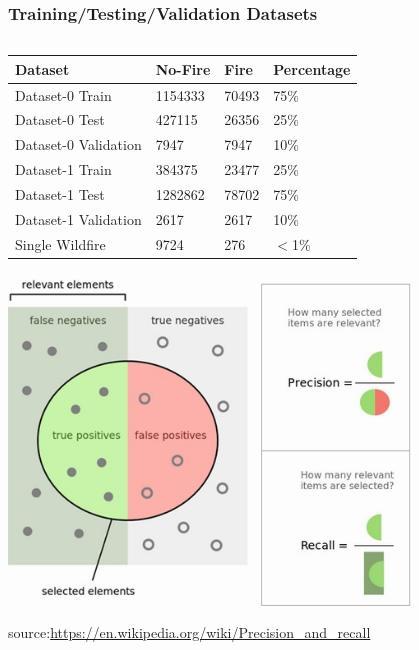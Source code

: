 \documentclass{beamer}
\begin{document}
\begin{frame}
  \frametitle{Training/Testing/Validation Datasets}


\begin{columns}[T]
    \begin{column}{.6\textwidth}
 \vspace{-0.25cm}   
\small
    \begin{tabular}{ | l | l | l | l |}
    \hline

    Dataset & No-Fire & Fire & Percentage\\ \hline
    Dataset-0 Train & 1154333 & 70493 & 75\% \\ 
    Dataset-0 Test  & 427115 & 26356 & 25\% \\ 

    Dataset-0 Validation & 7947 & 7947 & 10\% \\ \hline
    Dataset-1 Train & 384375 & 23477 & 25\% \\ 

    Dataset-1 Test  & 1282862 & 78702 & 75\% \\ 

    Dataset-1 Validation & 2617 & 2617 & 10\% \\ \hline
    Single Wildfire & 9724 & 276 & $<$1\% \\ 
    
    \hline
    \end{tabular}

  \centering
\includegraphics[width=0.8\textwidth]{figs/precision-recall-relevant-selected.jpg}
\\
\tiny{source:\url{https://en.wikipedia.org/wiki/Precision_and_recall}}


\end{column}
\end{columns}
\end{frame}
\end{document}
